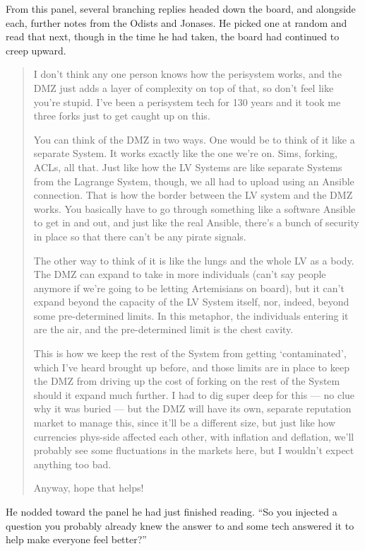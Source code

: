 From this panel, several branching replies headed down the board, and alongside each, further notes from the Odists and Jonases. He picked one at random and read that next, though in the time he had taken, the board had continued to creep upward.

\begin{quote}
I don't think any one person knows how the perisystem works, and the DMZ just adds a layer of complexity on top of that, so don't feel like you're stupid. I've been a perisystem tech for 130 years and it took me three forks just to get caught up on this.

You can think of the DMZ in two ways. One would be to think of it like a separate System. It works exactly like the one we're on. Sims, forking, ACLs, all that. Just like how the LV Systems are like separate Systems from the Lagrange System, though, we all had to upload using an Ansible connection. That is how the border between the LV system and the DMZ works. You basically have to go through something like a software Ansible to get in and out, and just like the real Ansible, there's a bunch of security in place so that there can't be any pirate signals.

The other way to think of it is like the lungs and the whole LV as a body. The DMZ can expand to take in more individuals (can't say people anymore if we're going to be letting Artemisians on board), but it can't expand beyond the capacity of the LV System itself, nor, indeed, beyond some pre-determined limits. In this metaphor, the individuals entering it are the air, and the pre-determined limit is the chest cavity.

This is how we keep the rest of the System from getting `contaminated', which I've heard brought up before, and those limits are in place to keep the DMZ from driving up the cost of forking on the rest of the System should it expand much further. I had to dig super deep for this — no clue why it was buried — but the DMZ will have its own, separate reputation market to manage this, since it'll be a different size, but just like how currencies phys-side affected each other, with inflation and deflation, we'll probably see some fluctuations in the markets here, but I wouldn't expect anything too bad.

Anyway, hope that helps!
\end{quote}

He nodded toward the panel he had just finished reading. ``So you injected a question you probably already knew the answer to and some tech answered it to help make everyone feel better?''

